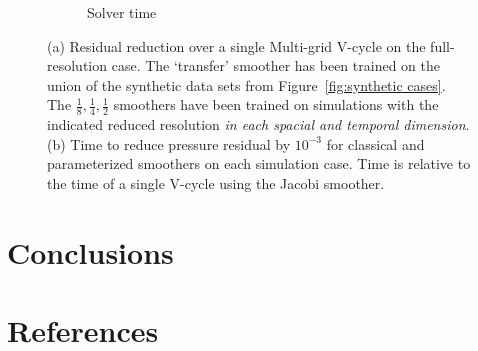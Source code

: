 \documentclass[review]{elsarticle}
\begin{document}
\begin{figure}
\begin{subfigure}[b]{0.48\textwidth}
        \caption{Solver time}
        \label{fig:simulation time}
    \end{subfigure}
        \caption{(a) Residual reduction over a single Multi-grid V-cycle on the full-resolution case. The `transfer' smoother has been trained on the union of the synthetic data sets from Figure~\ref{fig:synthetic cases}. The $\frac 18, \frac 14, \frac 12$ smoothers have been trained on simulations with the indicated reduced resolution \textit{in each spacial and temporal dimension}. (b) Time to reduce pressure residual by $10^{-3}$ for classical and parameterized smoothers on each simulation case. Time is relative to the time of a single V-cycle using the Jacobi smoother.}
        \label{fig:tuned simulation}
\end{figure}


\section{Conclusions}

\section*{References}


\end{document}
